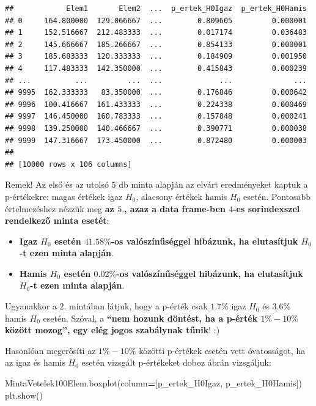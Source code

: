 \documentclass[
]{book}
\newenvironment{Shaded}{\begin{snugshade}}{\end{snugshade}}
\newcommand{\NormalTok}[1]{#1}
\newcommand{\OperatorTok}[1]{\textcolor[rgb]{0.81,0.36,0.00}{\textbf{#1}}}
\newcommand{\StringTok}[1]{\textcolor[rgb]{0.31,0.60,0.02}{#1}}
\providecommand{\tightlist}{%
  \setlength{\itemsep}{0pt}\setlength{\parskip}{0pt}}
\begin{document}
\begin{verbatim}
##            Elem1       Elem2  ...  p_ertek_H0Igaz  p_ertek_H0Hamis
## 0     164.800000  129.066667  ...        0.809605         0.000001
## 1     152.516667  212.483333  ...        0.017174         0.036483
## 2     145.666667  185.266667  ...        0.854133         0.000001
## 3     185.683333  120.333333  ...        0.184909         0.001950
## 4     117.483333  142.350000  ...        0.415843         0.000239
## ...          ...         ...  ...             ...              ...
## 9995  162.333333   83.350000  ...        0.176846         0.000642
## 9996  100.416667  161.433333  ...        0.224338         0.000469
## 9997  146.450000  160.783333  ...        0.157848         0.000241
## 9998  139.250000  140.466667  ...        0.390771         0.000038
## 9999  147.316667  173.450000  ...        0.872480         0.000003
## 
## [10000 rows x 106 columns]
\end{verbatim}

Remek! Az első és az utolsó \(5\) db minta alapján az elvárt eredményeket kaptuk a p-értékekre: magas értékek igaz \(H_0\), alacsony értékek hamis \(H_0\) esetén. Pontosabb értelmezéshez nézzük meg \textbf{az \(5.\), azaz a data frame-ben \(4\)-es sorindexszel rendelkező minta esetét}:

\begin{itemize}
\tightlist
\item
  \textbf{Igaz \(H_0\) esetén \(41.58\%\)-os valószínűséggel hibázunk, ha elutasítjuk \(H_0\)-t ezen minta alapján}.
\item
  \textbf{Hamis \(H_0\) esetén \(0.02\%\)-os valószínűséggel hibázunk, ha elutasítjuk \(H_0\)-t ezen minta alapján}.
\end{itemize}

Ugyanakkor a \(2.\) mintában látjuk, hogy a p-érték csak \(1.7\%\) igaz \(H_0\) és \(3.6\%\) hamis \(H_0\) esetén. Szóval, a \textbf{``nem hozunk döntést, ha a p-érték \(1\% - 10\%\) között mozog'', egy elég jogos szabálynak tűnik}! :)

Hasonlóan megerősíti az \(1\% - 10\%\) közötti p-értékek esetén vett óvatosságot, ha az igaz és hamis \(H_0\) esetén vizsgált p-értékeket doboz ábrán vizsgáljuk:

\begin{Shaded}
\begin{Highlighting}[]
\NormalTok{MintaVetelek100Elem.boxplot(column}\OperatorTok{=}\NormalTok{[}\StringTok{\textquotesingle{}p\_ertek\_H0Igaz\textquotesingle{}}\NormalTok{, }\StringTok{\textquotesingle{}p\_ertek\_H0Hamis\textquotesingle{}}\NormalTok{])}
\NormalTok{plt.show()}
\end{Highlighting}
\end{Shaded}
\end{document}
